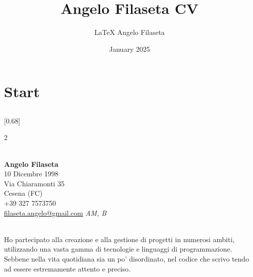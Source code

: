 \documentclass[allblack]{simplehipstercv}
\title{Angelo Filaseta CV}
\author{\LaTeX{} Angelo Filaseta}
\date{January 2025}
\begin{document}
\thispagestyle{empty}

\section*{Start}


\subsection*{}
\vspace{4em}

\setlength{\columnsep}{1.5cm}
[0.68]
\begin{paracol}{2}


\paracolbackgroundoptions


\footnotesize
{\setasidefontcolour

    \begin{center}
    \end{center}
    \flushright
     \\[0.5em]
    {\small
    \textbf{Angelo Filaseta}\\
    }
    \vspace{0.5em}
    {\footnotesize
     10 Dicembre 1998\\
     Via Chiaramonti 35 \\
     Cesena (FC) \\
     +39 327 7573750 \\
      \href{mailto:filaseta.angelo@gmail.com}{\protect\url{filaseta.angelo@gmail.com}}
     \textit{AM, B}
    }
    \bigskip

    \\[0.5em]
    Ho partecipato alla creazione e alla gestione di progetti in numerosi ambiti,
    utilizzando una vasta gamma di tecnologie e linguaggi di programmazione.\\
    Sebbene nella vita quotidiana sia un po' disordinato,
    nel codice che scrivo tendo ad essere estremamente attento e preciso.
    \bigskip

}
\end{paracol}
\end{document}
